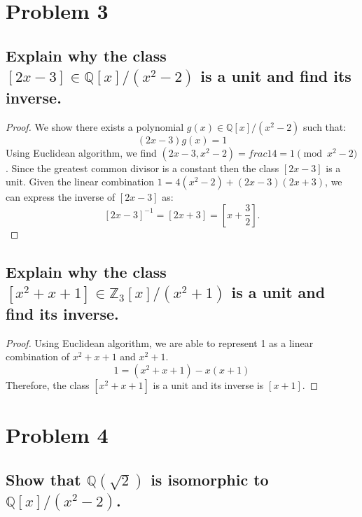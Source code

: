 \documentclass{article}
\theoremstyle{plain} %
\theoremstyle{definition} %
\begin{document}
\section*{Problem 3}
\subsection*{Explain why the class $[2x-3] \in \mathbb{Q}[x]/(x^2-2)$
is a unit and find its inverse.}

\begin{proof}
    We show there exists a polynomial $g(x) \in \mathbb{Q}[x]/(x^2-2)$ such that:
    \[
        (2x-3)g(x) = 1
    \]
    Using Euclidean algorithm, we find $(2x-3, x^2-2) = frac{1}{4} = 1 \pmod{x^2-2}$.
    Since the greatest common divisor is a constant then the class $[2x-3]$ is a unit.
    Given the linear combination $1 = 4(x^2-2) + (2x-3)(2x+3)$, we can express
    the inverse of $[2x-3]$ as:
    \[
        [2x-3]^{-1} = [2x+3] = [x+\frac{3}{2}].
    \]
\end{proof}

\subsection*{Explain why the class $[x^2+x+1] \in \mathbb{Z}_3[x]/(x^2+1)$
is a unit and find its inverse.}

\begin{proof}
    Using Euclidean algorithm, we are able to represent 1 as a linear combination of $x^2+x+1$ and $x^2+1$.
    \[
        1 = (x^2+x+1) - x(x+1)
    \]
    Therefore, the class $[x^2+x+1]$ is a unit and its inverse is $[x+1]$.
\end{proof}

\section*{Problem 4}
\subsection*{Show that $\mathbb{Q}(\sqrt{2})$ is isomorphic to $\mathbb{Q}[x]/(x^2-2)$.}
\end{document}
